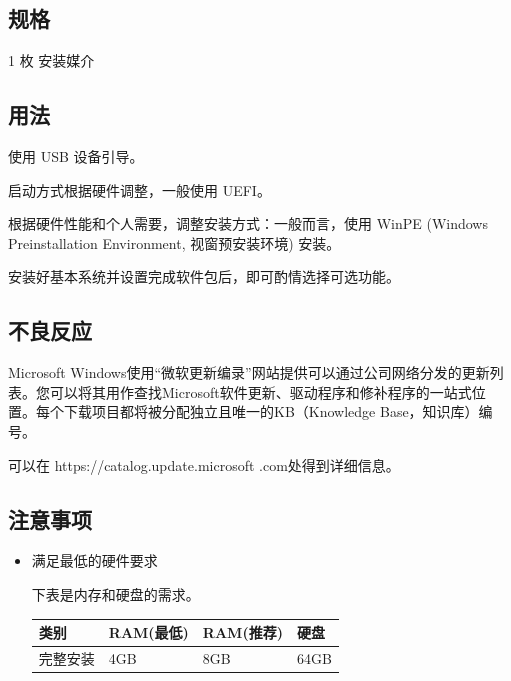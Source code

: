 \documentclass{article}
\begin{document}
\begin{multicols*}{3}
	\begin{tcolorbox}
	\section*{规格}
	\end{tcolorbox}

	1 枚 安装媒介

	\medskip

	\begin{tcolorbox}
	\section*{用法}
	\end{tcolorbox}

	使用 USB 设备引导。

	启动方式根据硬件调整，一般使用 UEFI。

	根据硬件性能和个人需要，调整安装方式：一般而言，使用 WinPE (Windows Preinstallation  Environment, 视窗预安装环境) 安装。

	安装好基本系统并设置完成软件包后，即可酌情选择可选功能。

	\medskip

	\begin{tcolorbox}
	\section*{不良反应}
	\end{tcolorbox}

	Microsoft Windows使用“微软更新编录”网站提供可以通过公司网络分发的更新列表。您可以将其用作查找Microsoft软件更新、驱动程序和修补程序的一站式位置。每个下载项目都将被分配独立且唯一的KB（Knowledge Base，知识库）编号。

	可以在 https://catalog.update.microsoft
 .com处得到详细信息。

	\medskip


	\begin{tcolorbox}
	\section*{注意事项}
	\end{tcolorbox}
	\begin{itemize}[leftmargin=*]

		\item 满足最低的硬件要求

		下表是内存和硬盘的需求。

		{\small\begin{tabularx}{\linewidth}{|X|X|X|X|}
			\hline
			类别 & RAM\newline (最低) & RAM\newline (推荐) & 硬盘 \\
			\hline
			完整安装 & 4GB & 8GB & 64GB \\
			\hline
		\end{tabularx}}


\end{itemize}
\end{multicols*}
\end{document}
